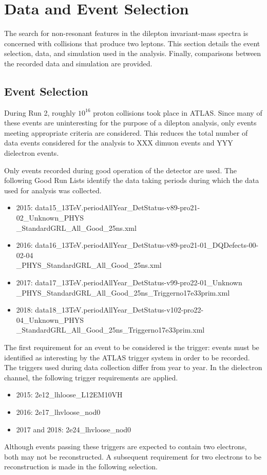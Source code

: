 \section{Data and Event Selection}\label{sec:ciEvSel}

The search for non-resonant features in the dilepton invariant-mass spectra is concerned with collisions that produce two leptons.
This section details the event selection, data, and simulation used in the analysis.
Finally, comparisons between the recorded data and simulation are provided.


\subsection{Event Selection}
During Run 2, roughly $10^{16}$ proton collisions took place in ATLAS. \check
Since many of these events are uninteresting for the purpose of a dilepton analysis, only events meeting appropriate criteria are considered.
This reduces the total number of data events considered for the analysis to {\color{red}XXX} dimuon events and {\color{red}YYY} dielectron events.

Only events recorded during good operation of the detector are used.
The following Good Run Lists identify the data taking periods during which the data used for analysis was collected.
\begin{itemize}
	\item 2015: data15\_13TeV.periodAllYear\_DetStatus-v89-pro21-02\_Unknown\_PHYS \\ \_StandardGRL\_All\_Good\_25ns.xml
	\item 2016: data16\_13TeV.periodAllYear\_DetStatus-v89-pro21-01\_DQDefects-00-02-04 \\ \_PHYS\_StandardGRL\_All\_Good\_25ns.xml
	\item 2017: data17\_13TeV.periodAllYear\_DetStatus-v99-pro22-01\_Unknown \\ \_PHYS\_StandardGRL\_All\_Good\_25ns\_Triggerno17e33prim.xml
	\item 2018: data18\_13TeV.periodAllYear\_DetStatus-v102-pro22-04\_Unknown\_PHYS \\ \_StandardGRL\_All\_Good\_25ns\_Triggerno17e33prim.xml
\end{itemize}

The first requirement for an event to be considered is the trigger: events must be identified as interesting by the ATLAS trigger system in order to be recorded.
The triggers used during data collection differ from year to year. 
In the dielectron channel, the following trigger requirements are applied.
\begin{itemize}
	\item 2015: 2e12\_lhloose\_L12EM10VH
	\item 2016: 2e17\_lhvloose\_nod0
	\item 2017 and 2018: 2e24\_lhvloose\_nod0
\end{itemize}
Although events passing these triggers are expected to contain two electrons, both may not be reconstructed. 
A subsequent requirement for two electrons to be reconstruction is made in the following selection.


